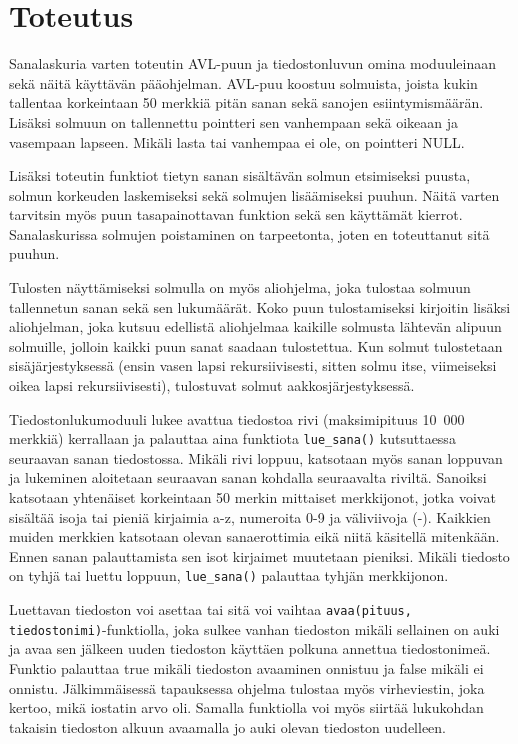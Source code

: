 \documentclass[12pt,a4paper,titlepage]{article}
\begin{document}
\section{Toteutus}
Sanalaskuria varten toteutin AVL-puun ja tiedostonluvun omina moduuleinaan sekä näitä käyttävän pääohjelman. AVL-puu koostuu solmuista, joista kukin tallentaa korkeintaan 50 merkkiä pitän sanan sekä sanojen esiintymismäärän. Lisäksi solmuun on tallennettu pointteri sen vanhempaan sekä oikeaan ja vasempaan lapseen. Mikäli lasta tai vanhempaa ei ole, on pointteri NULL.

Lisäksi toteutin funktiot tietyn sanan sisältävän solmun etsimiseksi puusta, solmun korkeuden laskemiseksi sekä solmujen lisäämiseksi puuhun. Näitä varten tarvitsin myös puun tasapainottavan funktion sekä sen käyttämät kierrot. Sanalaskurissa solmujen poistaminen on tarpeetonta, joten en toteuttanut sitä puuhun.

Tulosten näyttämiseksi solmulla on myös aliohjelma, joka tulostaa solmuun tallennetun sanan sekä sen lukumäärät. Koko puun tulostamiseksi kirjoitin lisäksi aliohjelman, joka kutsuu edellistä aliohjelmaa kaikille solmusta lähtevän alipuun solmuille, jolloin kaikki puun sanat saadaan tulostettua. Kun solmut tulostetaan sisäjärjestyksessä (ensin vasen lapsi rekursiivisesti, sitten solmu itse, viimeiseksi oikea lapsi rekursiivisesti), tulostuvat solmut aakkosjärjestyksessä.

Tiedostonlukumoduuli lukee avattua tiedostoa rivi (maksimipituus 10~000 merkkiä) kerrallaan ja palauttaa aina funktiota \texttt{lue\_sana()} kutsuttaessa seuraavan sanan tiedostossa. Mikäli rivi loppuu, katsotaan myös sanan loppuvan ja lukeminen aloitetaan seuraavan sanan kohdalla seuraavalta riviltä. Sanoiksi katsotaan yhtenäiset korkeintaan 50 merkin mittaiset merkkijonot, jotka voivat sisältää isoja tai pieniä kirjaimia a-z, numeroita 0-9 ja väliviivoja (-). Kaikkien muiden merkkien katsotaan olevan sanaerottimia eikä niitä käsitellä mitenkään. Ennen sanan palauttamista sen isot kirjaimet muutetaan pieniksi. Mikäli tiedosto on tyhjä tai luettu loppuun, \texttt{lue\_sana()} palauttaa tyhjän merkkijonon.

Luettavan tiedoston voi asettaa tai sitä voi vaihtaa \texttt{avaa(pituus, tiedostonimi)}-\-funktiolla, joka sulkee vanhan tiedoston mikäli sellainen on auki ja avaa sen jälkeen uuden tiedoston käyttäen polkuna annettua tiedostonimeä. Funktio palauttaa true mikäli tiedoston avaaminen onnistuu ja false mikäli ei onnistu. Jälkimmäisessä tapauksessa ohjelma tulostaa myös virheviestin, joka kertoo, mikä iostatin arvo oli. Samalla funktiolla voi myös siirtää lukukohdan takaisin tiedoston alkuun avaamalla jo auki olevan tiedoston uudelleen.
\end{document}

